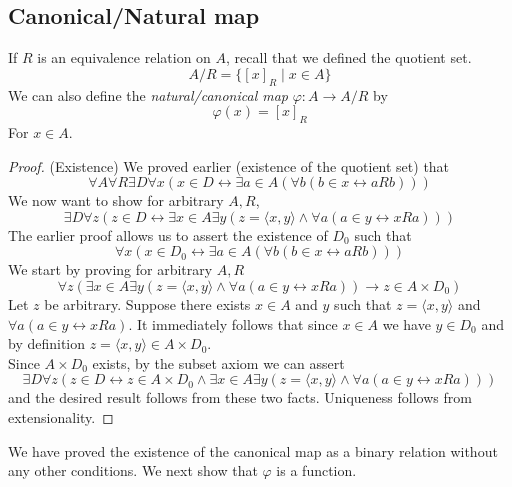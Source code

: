 \documentclass{report}
\begin{document}
\subsection{Canonical/Natural map}
If $R$ is an equivalence relation on $A$, recall that we defined the quotient set.
\begin{equation*}
A/R=\{[x]_R\mid x\in A\}
\end{equation*}
We can also define the \textit{natural/canonical map} $\varphi:A\to A/R$ by
\begin{equation*}
\varphi(x)=[x]_R
\end{equation*}
For $x\in A$.
\begin{proof}(Existence)
We proved earlier (existence of the quotient set) that
\begin{equation*}
\forall A\forall R\exists D\forall x(x\in D\leftrightarrow\exists a\in A(\forall b(b\in x\leftrightarrow aRb)))
\end{equation*}
We now want to show for arbitrary $A,R$,
\begin{equation*}
\exists D\forall z(z\in D\leftrightarrow\exists x\in A\exists y(z=\langle x,y\rangle\land\forall a(a\in y\leftrightarrow xRa)))
\end{equation*}
The earlier proof allows us to assert the existence of $D_0$ such that 
\begin{equation*}
\forall x(x\in D_0\leftrightarrow\exists a\in A(\forall b(b\in x\leftrightarrow aRb)))
\end{equation*}
We start by proving for arbitrary $A,R$
\begin{equation*}
\forall z(\exists x\in A\exists y(z=\langle x,y\rangle\land\forall a(a\in y\leftrightarrow xRa))\to z\in A\times D_0)
\end{equation*}
Let $z$ be arbitrary. Suppose there exists $x\in A$ and $y$ such that $z=\langle x,y\rangle$ and
$\forall a(a\in y\leftrightarrow xRa)$. It immediately follows that since $x\in A$ we have $y\in D_0$ and by definition 
$z=\langle x,y\rangle\in A\times D_0$.\\
\indent Since $A\times D_0$ exists, by the subset axiom we can assert
\begin{equation*}
\exists D\forall z(z\in D\leftrightarrow z\in A\times D_0\land\exists x\in A\exists y(z=\langle x,y\rangle\land\forall a(a\in y\leftrightarrow xRa)))
\end{equation*}
and the desired result follows from these two facts. Uniqueness follows from extensionality.
\end{proof}
\noindent We have proved the existence of the canonical map as a binary relation without any other conditions. We next show that $\varphi$ is a function.\\
\end{document}
